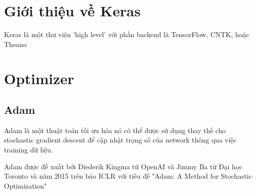 \documentclass{article}
\begin{document}
    \section{Giới thiệu về Keras}
        Keras là một thư viện 'high level' với phần backend là TensorFlow, CNTK, hoặc Theano
    \section{Optimizer}
    \subsection{Adam}
    Adam là một thuật toán tối ưu hóa nó có thể được sử dụng thay thế cho stochastic gradient descent
    để cập nhật trọng số của network thông qua việc training dữ liệu.
    \par
    Adam được đề xuất bởi Diederik Kingma từ OpenAI và Jimmy Ba từ Đại học Toronto và năm
    2015 trên báo ICLR với tiêu đề "Adam: A Method for Stochastic Optimization"
\end{document}
